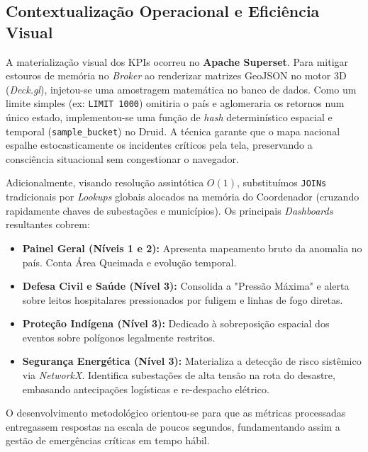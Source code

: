 \subsection{Contextualização Operacional e Eficiência Visual}

A materialização visual dos KPIs ocorreu no \textbf{Apache Superset}. Para mitigar estouros de memória no \textit{Broker} ao renderizar matrizes GeoJSON no motor 3D (\textit{Deck.gl}), injetou-se uma amostragem matemática no banco de dados. Como um limite simples (ex: \texttt{LIMIT 1000}) omitiria o país e aglomeraria os retornos num único estado, implementou-se uma função de \textit{hash} determinístico espacial e temporal (\texttt{sample\_bucket}) no Druid. A técnica garante que o mapa nacional espalhe estocasticamente os incidentes críticos pela tela, preservando a consciência situacional sem congestionar o navegador.

Adicionalmente, visando resolução assintótica $O(1)$, substituímos \texttt{JOINs} tradicionais por \textit{Lookups} globais alocados na memória do Coordenador (cruzando rapidamente chaves de subestações e municípios). Os principais \textit{Dashboards} resultantes cobrem:

\begin{itemize}
    \item \textbf{Painel Geral (Níveis 1 e 2):} Apresenta mapeamento bruto da anomalia no país. Conta Área Queimada e evolução temporal.
    \item \textbf{Defesa Civil e Saúde (Nível 3):} Consolida a "Pressão Máxima" e alerta sobre leitos hospitalares pressionados por fuligem e linhas de fogo diretas.
    \item \textbf{Proteção Indígena (Nível 3):} Dedicado à sobreposição espacial dos eventos sobre polígonos legalmente restritos.
    \item \textbf{Segurança Energética (Nível 3):} Materializa a detecção de risco sistêmico via \textit{NetworkX}. Identifica subestações de alta tensão na rota do desastre, embasando antecipações logísticas e re-despacho elétrico.
\end{itemize}

O desenvolvimento metodológico orientou-se para que as métricas processadas entregassem respostas na escala de poucos segundos, fundamentando assim a gestão de emergências críticas em tempo hábil.
